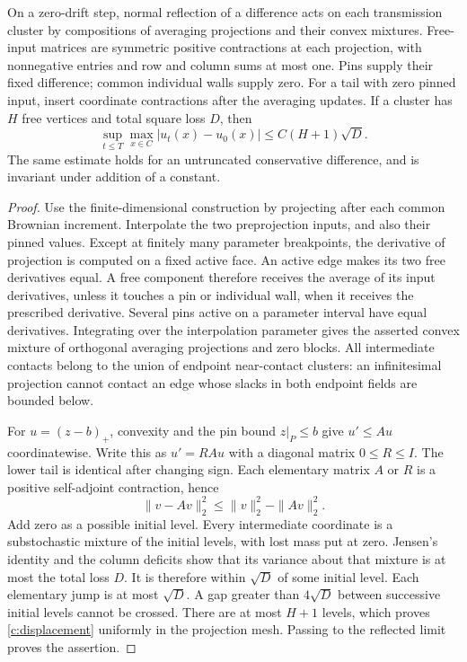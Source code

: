 \begin{lemma}\label{c:cluster}
On a zero-drift step, normal reflection of a difference acts on each
transmission cluster by compositions of averaging projections and their
convex mixtures. Free-input matrices are symmetric positive contractions
at each projection, with nonnegative entries and row and column sums
at most one. Pins supply their fixed difference; common individual
walls supply zero. For a tail with zero pinned input, insert coordinate
contractions after the averaging updates. If a cluster has $H$ free
vertices and total square loss $D$, then
\begin{equation}\label{c:displacement}
 \sup_{t\le T}\max_{x\in C}|u_t(x)-u_0(x)|
 \le C(H+1)\sqrt D.
\end{equation}
The same estimate holds for an untruncated conservative difference,
and is invariant under addition of a constant.
\end{lemma}
\begin{proof}
Use the finite-dimensional construction by projecting after each common
Brownian increment. Interpolate the two preprojection inputs, and also
their pinned values. Except at finitely many parameter breakpoints,
the derivative of projection is computed on a fixed active face.
An active edge makes its two free derivatives equal. A free component
therefore receives the average of its input derivatives, unless it
touches a pin or individual wall, when it receives the prescribed
derivative. Several pins active on a parameter interval have equal
derivatives. Integrating over the interpolation parameter gives the
asserted convex mixture of orthogonal averaging projections and zero
blocks. All intermediate contacts belong to the union of endpoint
near-contact clusters: an infinitesimal projection cannot contact an
edge whose slacks in both endpoint fields are bounded below.

For $u=(z-b)_+$, convexity and the pin bound $z|_P\le b$ give
$u'\le Au$ coordinatewise. Write this as $u'=RAu$ with a diagonal
matrix $0\le R\le I$. The lower tail is identical after changing sign.
Each elementary matrix $A$ or $R$ is a positive self-adjoint
contraction, hence
\[
 \|v-Av\|_2^2\le\|v\|_2^2-\|Av\|_2^2.
\]
Add zero as a possible initial level. Every intermediate coordinate
is a substochastic mixture of the initial levels, with lost mass put
at zero. Jensen's identity and the column deficits show that its
variance about that mixture is at most the total loss $D$. It is
therefore within $\sqrt D$ of some initial level. Each elementary
jump is at most $\sqrt D$. A gap greater than $4\sqrt D$ between
successive initial levels cannot be crossed. There are at most $H+1$
levels, which proves \eqref{c:displacement} uniformly in the projection
mesh. Passing to the reflected limit proves the assertion.
\end{proof}

